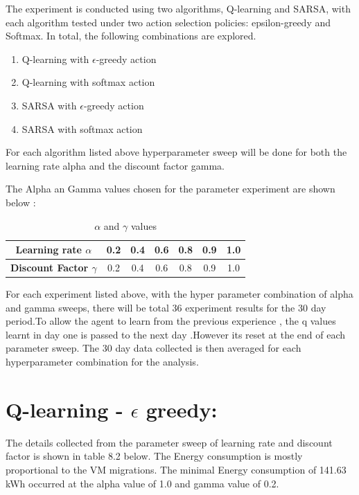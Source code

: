 \documentclass[a4paper,12pt]{Classes/RoboticsLaTeX}
\begin{document}
      The experiment is conducted using two algorithms, Q-learning and SARSA, with each algorithm tested under two action selection policies: epsilon-greedy and Softmax. In total, the following combinations are explored.
      
      \begin{enumerate}
      \item Q-learning with $\epsilon$-greedy action
      \item Q-learning with softmax action
      \item SARSA with $\epsilon$-greedy action
      \item SARSA with softmax action
      \end{enumerate}
      
      For each algorithm listed above hyperparameter sweep will be done for both the learning rate alpha and the discount factor gamma.

      The Alpha an Gamma  values chosen for the parameter experiment are shown below :

      \begin{table}[h!]
        \centering
        \begin{tabular}{|c|c|c|c|c|c|c|}
        \hline
        \textbf{Learning rate $\alpha$ } & 0.2 & 0.4 & 0.6 & 0.8 & 0.9 & 1.0 \\
        \hline
        \textbf{Discount Factor $\gamma$} & 0.2 & 0.4 & 0.6 & 0.8 & 0.9 & 1.0 \\
        \hline
        \end{tabular}
        \caption{$\alpha$ and $\gamma$ values}
        \end{table}

       For each experiment listed above, with the hyper parameter combination of alpha and gamma sweeps, there will be total 36 experiment results  for the 30 day period.To allow the agent to learn from the previous experience , the q values learnt in day one is passed to the next day .However its reset at the end of each parameter sweep. The 30 day data collected is then averaged for each hyperparameter combination for the analysis.

       \section{Q-learning - $\epsilon$ greedy:}
        The details collected from the parameter sweep of learning rate and discount factor is shown in table 8.2 below. The Energy consumption is mostly proportional to the  VM migrations. The minimal Energy consumption of 141.63 kWh occurred at the alpha value of 1.0 and gamma value of 0.2.
        
\end{document}
